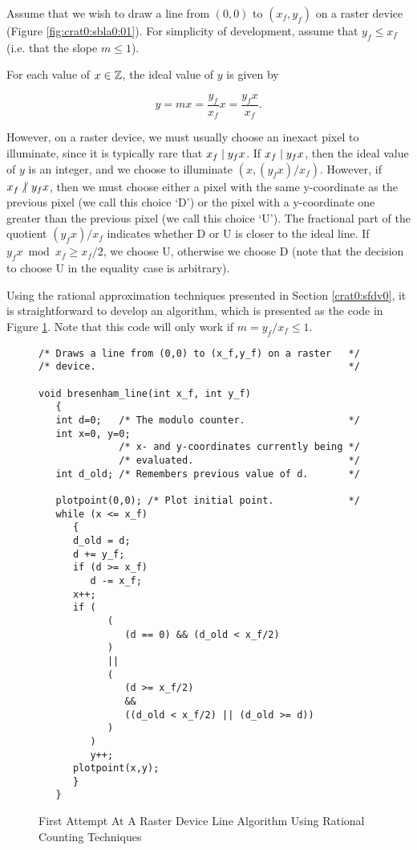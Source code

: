 Assume that we wish to draw a line from $(0,0)$ to $(x_f, y_f)$ on
a raster device (Figure \ref{fig:crat0:sbla0:01}).  For simplicity of
development, assume that $y_f \leq x_f$ (i.e. that the slope $m \leq 1$).

For each value of $x \in {\mathbb{Z}}$, the ideal value of $y$ is given
by

\begin{equation}
\label{eq:crat0:sbla0:01}
y = mx = \frac{y_f}{x_f} x = \frac{y_f x}{x_f} .
\end{equation}

\noindent{}However, on a raster device, we must usually
choose an inexact pixel to illuminate, since it is typically
rare that $x_f \mid y_f x$.  If
$x_f \mid y_f x$, then the ideal value of $y$ is
an integer, and we choose to illuminate
$(x, (y_f x)/x_f)$.  However, if $x_f \hspace{-0.125em}\not\hspace{0.245em}\mid\hspace{0.135em} y_f x$,
then we must choose either a pixel with the same y-coordinate
as the previous pixel (we call this choice `D') or the pixel
with a y-coordinate one greater than the previous pixel (we
call this choice `U').
The fractional part of the quotient 
$(y_f x) / x_f$ indicates whether D or U is closer to the ideal line.
If $y_f x \bmod x_f \geq x_f/2$, we choose U, otherwise we choose D
(note that the decision to choose U in the equality case is arbitrary).

Using the rational approximation techniques presented in 
Section \ref{crat0:sfdv0}, it is straightforward to 
develop an algorithm, which is presented as the code
in Figure \ref{fig:crat0:sbla0:02}.
Note that this code will only work if $m = y_f/x_f \leq 1$.

\begin{figure}
\begin{verbatim}
/* Draws a line from (0,0) to (x_f,y_f) on a raster   */
/* device.                                            */

void bresenham_line(int x_f, int y_f)
   {
   int d=0;   /* The modulo counter.                  */
   int x=0, y=0;
              /* x- and y-coordinates currently being */
              /* evaluated.                           */
   int d_old; /* Remembers previous value of d.       */

   plotpoint(0,0); /* Plot initial point.             */
   while (x <= x_f)
      {
      d_old = d;
      d += y_f;
      if (d >= x_f)
         d -= x_f;
      x++;
      if (
            (
               (d == 0) && (d_old < x_f/2)
            ) 
            || 
            (
               (d >= x_f/2) 
               && 
               ((d_old < x_f/2) || (d_old >= d))
            )
         )
         y++;
      plotpoint(x,y);
      }
   }
\end{verbatim}
\caption{First Attempt At A Raster Device Line Algorithm
         Using Rational Counting Techniques}
\label{fig:crat0:sbla0:02}
\end{figure}

